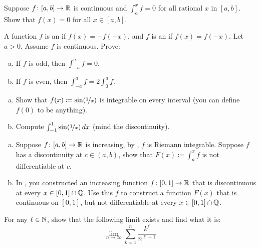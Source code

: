 \begin{exercise}
Suppose $f \colon [a,b] \to {\mathbb{R}}$ is continuous and
$\int_a^x f = 0$ for all rational $x$ in $[a,b]$.  Show that $f(x) = 0$
for all $x \in [a,b]$.
\end{exercise}

\begin{samepage}
\begin{exercise}
A function $f$ is an \emph{} if $f(x) = -f(-x)$,
and $f$ is an \emph{} if $f(x) = f(-x)$.  Let $a >
0$.  Assume $f$ is continuous.  Prove:
\begin{enumerate}[a)]
\item
If $f$ is odd, then $\int_{-a}^a f = 0$.
\item
If $f$ is even, then $\int_{-a}^a f = 2 \int_0^a f$.
\end{enumerate}
\end{exercise}
\end{samepage}

\begin{exercise}
\leavevmode
\begin{enumerate}[a)]
\item
Show that $f(x) \coloneqq \sin(\nicefrac{1}{x})$
is integrable on every interval (you can define $f(0)$ to be anything).
\item
Compute $\int_{-1}^1 \sin(\nicefrac{1}{x})\,dx$ (mind the
discontinuity).
\end{enumerate}
\end{exercise}

\begin{exercise}
\leavevmode
\begin{enumerate}[a)]
\item
Suppose $f \colon [a,b] \to {\mathbb{R}}$ is increasing, by
,
$f$ is Riemann integrable.  Suppose $f$ has a discontinuity at $c \in
(a,b)$, show that $F(x) \coloneqq \int_a^x f$ is not differentiable at $c$.
\item
In , you constructed an increasing
function $f \colon [0,1] \to {\mathbb{R}}$ that is discontinuous at every
$x \in [0,1] \cap {\mathbb{Q}}$.  Use this $f$ to construct a function $F(x)$ that is
continuous on $[0,1]$, but not differentiable at every $x \in [0,1] \cap {\mathbb{Q}}$.
\end{enumerate}

\begin{exercise}
For any $\ell \in {\mathbb{N}}$,
show that the following limit exists and find what it is:
\begin{equation*}
\lim_{n\to\infty} \sum_{k=1}^n \frac{k^\ell}{n^{\ell+1}}
\end{equation*}
\end{exercise}
\end{exercise}

